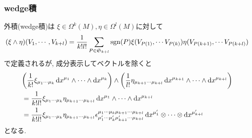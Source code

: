 \documentclass[dvipdfmx]{jsarticle}
\begin{document}
\subsubsection{wedge積}

外積(wedge積)は
$\xi\in\Omega^k(M), \eta\in\Omega^l(M)$に対して
\begin{align*}
    (\xi\wedge\eta)(V_1,\cdots,V_{k+l})
    =
    \frac{1}{k!l!}
    \sum_{P\in\mathfrak{S}_{k+l}}\mathrm{sgn}(P)\xi(V_{P(1)},\cdots V_{P(k)})\eta(V_{P(k+1)},\cdots V_{P(k+l)})
\end{align*}
で定義されるが,
成分表示してベクトルを除くと
\begin{equation*}
    \begin{split}
        &
        \qty(
            \frac{1}{k!}
            \xi_{\mu_1\cdots\mu_k}
            \dd{x}^{\mu_1}
            \wedge\cdots\wedge
            \dd{x}^{\mu_k}
        )
        \wedge
        \qty(
            \frac{1}{l!}
            \eta_{\mu_{k+1}\cdots\mu_{k+l}}
            \dd{x}^{\mu_{k+1}}
            \wedge\cdots\wedge
            \dd{x}^{\mu_{k+l}}
        )
        \\
        &=
        \frac{1}{k!l!}
        \xi_{\mu_1\cdots\mu_k}
        \eta_{\mu_{k+1}\cdots\mu_{k+l}}
        \dd{x}^{\mu_1}
        \wedge\cdots\wedge
        \dd{x}^{\mu_{k+l}}
        \\
        &=
        \frac{1}{k!l!}
        \xi_{\mu_1\cdots\mu_k}
        \eta_{\mu_{k+1}\cdots\mu_{k+l}}
        \epsilon^{\mu_1\cdots\mu_k\mu_{k+1}\cdots\mu_{k+l}}_{\mu_1'\cdots\mu_k'\mu_{k+1}'\cdots\mu_{k+l}}
        \dd{x}^{\mu_1'}
        \otimes\cdots\otimes
        \dd{x}^{\mu_{k+l}'}
    \end{split}
\end{equation*}
となる.
\end{document}
